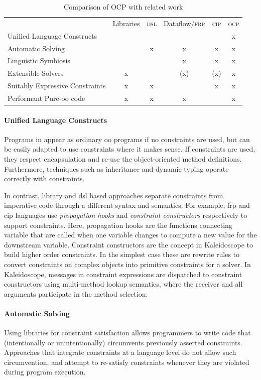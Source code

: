 \begin{table}
  \centering
  \begin{tabular}{l|c|c|c|c|c}
    & Libraries & \textsc{dsl} & Dataflow/\textsc{frp} & \textsc{cip} & \textsc{ocp} \\
    Unified Language Constructs & & & & & x \\
    Automatic Solving & & x & x & x & x \\
    Linguistic Symbiosis & & & x & x & x \\
    Extensible Solvers & x & & (x) & (x) & x \\
    Suitably Expressive Constraints & x & x & & x & x \\
    Performant Pure-\ac{oo} code & x & x & x & & x \\
  \end{tabular}
  \caption{Comparison of OCP with related work}
  \label{tab:cmp-constraint-lang-approaches}
\end{table}

\paragraph{Unified Language Constructs}
Programs in \langname appear as ordinary \ac{oo} programs if no
constraints are used, but can be easily adapted to use constraints
where it makes sense. If constraints are used, they respect
encapsulation and re-use the object-oriented method
definitions. Furthermore,  techniques such as
inheritance and dynamic typing operate correctly with constraints.

In contrast, library and \ac{dsl} based approaches separate
constraints from imperative code through a different syntax and
semantics. For example, \ac{frp} and \ac{cip} languages use
\emph{propagation hooks} and \emph{constraint constructors}
respectively to support constraints. Here, propagation hooks are the
functions connecting variable that are called when one variable
changes to compute a new value for the downstream variable. Constraint
constructors are the concept in Kaleidoscope to build higher order
constraints. In the simplest case these are rewrite rules to convert
constraints on complex objects into primitive constraints for a
solver. In Kaleidoscope, messages in constraint expressions are
dispatched to constraint constructors using multi-method lookup
semantics, where the receiver and all arguments participate in the
method selection.

\paragraph{Automatic Solving}
Using libraries for constraint satisfaction allows programmers to
write code that (intentionally or unintentionally) circumvents
previously asserted constraints. Approaches that integrate constraints
at a language level do not allow such circumvention, and attempt to
re-satisfy constraints whenever they are violated during program
execution.

